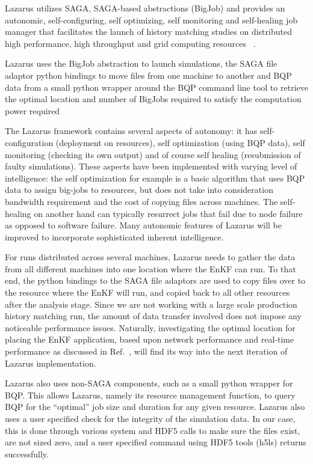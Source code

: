 \documentclass{rspublic}
\begin{document}
Lazarus utilizes SAGA, SAGA-based abstractions (BigJob) and provides
an autonomic, self-configuring, self optimizing, self monitoring and
self-healing job manager that facilitates the launch of history
matching studies on distributed high performance, high throughput and
grid computing resources ~\citep{gmac}.

Lazarus uses the BigJob abstraction to launch simulations,
the SAGA file adaptor python bindings to move files from one machine
to another and BQP data from a small python wrapper around the BQP
command line tool to retrieve the optimal location and number of
BigJobs required to satisfy the computation power required

The Lazarus framework contains several aspects of autonomy: it has
self-configuration (deployment on resources), self optimization (using
BQP data), self monitoring (checking its own output) and of course
self healing (resubmission of faulty simulations). These aspects have
been implemented with varying level of intelligence: the self
optimization for example is a basic algorithm that uses BQP data to
assign big-jobs to resources, but does not take into consideration
bandwidth requirement and the cost of copying files across
machines. The self-healing on another hand can typically resurrect
jobs that fail due to node failure as opposed to software
failure. Many autonomic features of Lazarus will be improved to
incorporate sophisticated inherent intelligence.

For runs distributed across several machines, Lazarus needs to gather
the data from all different machines into one location where the EnKF
can run. To that end, the python bindings to the SAGA file adaptors
are used to copy files over to the resource where the EnKF will run,
and copied back to all other resources after the analysis stage. Since
we are not working with a large scale production history matching run,
the amount of data transfer involved does not impose any noticeable
performance issues. Naturally, investigating the optimal location for
placing the EnKF application, based upon network performance and
real-time performance as discussed in Ref.~\cite{escience07}, will
find its way into the next iteration of Lazarus implementation.

Lazarus also uses non-SAGA components, such as a small python wrapper
for BQP. This allows Lazarus, namely its resource management function,
to query BQP for the ``optimal'' job size and duration for any given
resource. Lazarus also uses a user specified check for the integrity
of the simulation data. In our case, this is done through various
system and HDF5 calls to make sure the files exist, are not sized
zero, and a user specified command using HDF5 tools (h5ls) returns
successfully.
\end{document}
